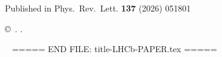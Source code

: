 \begin{titlepage}
\begin{abstract}
\end{abstract}

\vspace*{2.0cm}

\begin{center}
    Published in
    Phys.~Rev.~Lett. {\bf 137} (2026) 051801
\end{center}

\vspace{\fill}

{\footnotesize
\centerline{\copyright~\papercopyright. \href{\paperlicenceurl}{\paperlicence}.}}
\vspace*{2mm}

\end{titlepage}

\newpage
\setcounter{page}{2}
\mbox{~}
===== END FILE: title-LHCb-PAPER.tex =====
